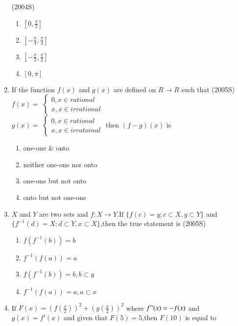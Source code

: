 \documentclass[journal,12pt,twocolumn]{IEEEtran}
\theoremstyle{remark}
\begin{document}
\begin{enumerate}
\hfill(2004S)\\
\begin{multicols}{2}
\begin{enumerate}
    \item $\left[0,\frac{\pi}{2}\right]$\\
    \item $\left[-\frac{\pi}{4},\frac{\pi}{4}\right]$\\
    \item $\left[-\frac{\pi}{2},\frac{\pi}{2}\right]$\\
    \item $[0,\pi]$
\end{enumerate}
\end{multicols}
\item If the function $f(x)$ and $g(x)$ are defined on $R \rightarrow R $ such that
\hfill(2005S)
\\$f(x)=$
$ \begin{cases}
    0, x \in rational\\
    x, x \in irrational 
\end{cases} $ \\
    $g(x)=$
$\begin{cases}
    0,x \in rational\\
    x,x \in irratoinal
\end{cases}$
then $(f-g)(x)$ is 
\begin{enumerate}
    \item one-one \& onto 
    \item neither one-one nor onto
    \item one-one but not onto 
    \item onto but not one-one
\end{enumerate}
\item $X$ and $Y$ are two sets and $f:X\rightarrow Y$.If $ \{f(c)=y;c \subset X,y \subset Y\} $ and $ \{f^{-1}(d)=X;d \subset Y,x \subset X \} $,then the true statement is 
\hfill(2005S)\\
\begin{enumerate}
    \item $f(f^{-1}(b))=b$
    \item $f^{-1}(f(a))=a$
    \item $f(f^{-1}(b))=b,b \subset y$
    \item $f^{-1}(f(a))=a,a \subset x$
\end{enumerate}
\item If $F(x)=\left( f\left( \frac{x}{2}\right) \right)^2 + \left(g\left (\frac{x}{2}\right) \right)^2$ where $f"(x)=-f(x)$ and $ g(x)=f'(x)$ and given that $F(5)=5$,then $F(10)$ is equal to 

\end{enumerate}
\end{document}
